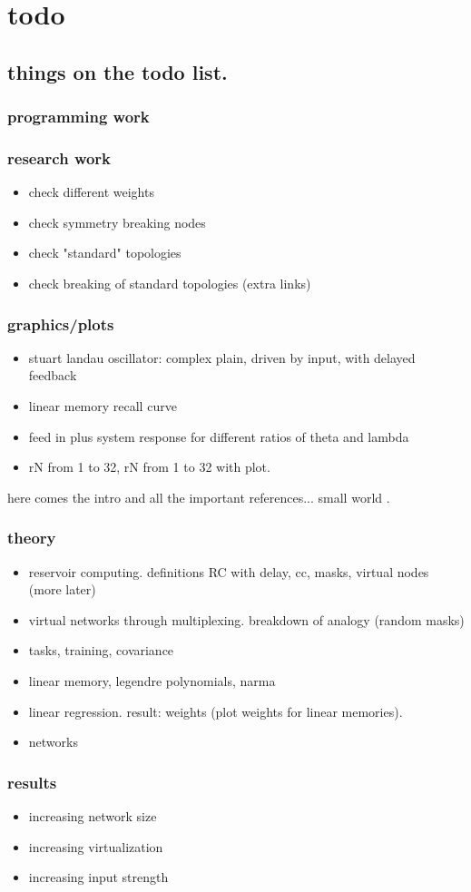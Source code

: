 \chapter{todo}

\section{things on the todo list.}

\subsection{programming work}

\subsection{research work}
\begin{itemize}
    \item check different weights
    \item check symmetry breaking nodes
    \item check "standard" topologies
    \item check breaking of standard topologies (extra links)
\end{itemize}

\subsection{graphics/plots}
\begin{itemize}
	\item stuart landau oscillator: complex plain, driven by input, with delayed feedback
	\item linear memory recall curve
    \item feed in plus system response for different ratios of theta and lambda
    \item rN from 1 to 32, rN from 1 to 32 with plot.
\end{itemize}

here comes the intro and all the important references...
small world \cite{WAT98}.

\subsection{theory}
	\begin{itemize}
		\item reservoir computing. definitions RC with delay, cc, masks, virtual nodes (more later)
		\item virtual networks through multiplexing. breakdown of analogy (random masks)
		\item tasks, training, covariance
		\item linear memory, legendre polynomials, narma
		\item linear regression. result: weights (plot weights for linear memories).
		\item networks
	\end{itemize}

\subsection{results}
	\begin{itemize}
		\item increasing network size
		\item increasing virtualization
		\item increasing input strength
	\end{itemize}
